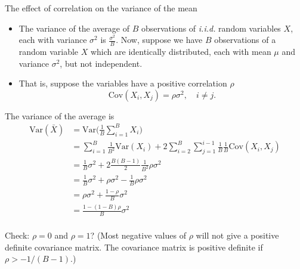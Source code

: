 \documentclass[10pt,ignorenonframetext,]{beamer}
\begin{document}
\begin{frame}

\begin{block}{The effect of correlation on the variance of the mean}

\vspace{2mm}

\begin{itemize}
\item
  The variance of the average of \(B\) observations of \emph{i.i.d.}
  random variables \(X\), each with variance \(\sigma^2\) is
  \(\frac{\sigma^2}{B}\). Now, suppose we have \(B\) observations of a
  random variable \(X\) which are identically distributed, each with
  mean \(\mu\) and variance \(\sigma^2\), but not independent.
\item
  That is, suppose the variables have a positive correlation \(\rho\)
  \[\text{Cov}(X_i, X_j) = \rho \sigma^2, \quad i \neq j.\]
\end{itemize}

\end{block}

\end{frame}

\begin{frame}

The variance of the average is
\[\begin{aligned} \text{Var}(\bar{X}) &= \text{Var}\Big( \frac{1}{B}\sum_{i=1}^B X_i \Big) \\
&= \sum_{i=1}^B \frac{1}{B^2} \text{Var} (X_i) + 2 \sum_{i=2}^B \sum_{j=1}^{i-1} \frac{1}{B} \frac{1}{B} \text{Cov} (X_i, X_j) \\
&= \frac{1}{B} \sigma^2 + 2 \frac{B(B-1)}{2}\frac{1}{B^2} \rho \sigma^2 \\
&= \frac{1}{B} \sigma^2 + \rho \sigma^2 - \frac{1}{B} \rho \sigma^2 \\
&= \rho \sigma^2 + \frac{1-\rho}{B}\sigma^2\\
&= \frac{1-(1-B)\rho}{B} \sigma^2\\ \end{aligned}\]

Check: \(\rho=0\) and \(\rho=1\)? (Most negative values of \(\rho\) will
not give a positive definite covariance matrix. The covariance matrix is
positive definite if \(\rho>-1/(B-1)\).)

\end{frame}
\end{document}
